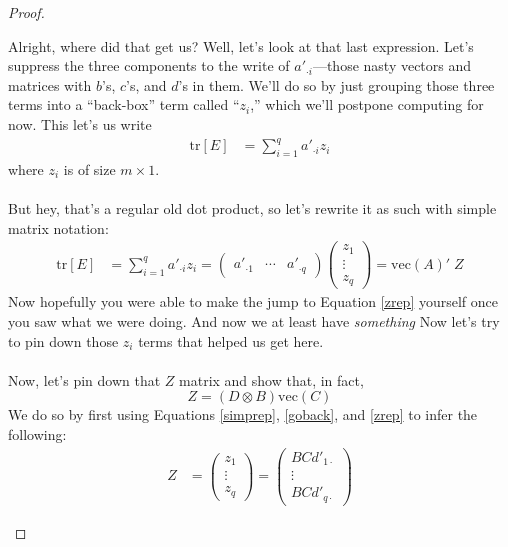 \documentclass[12pt]{article}
\theoremstyle{plain}
\theoremstyle{definition}
\theoremstyle{remark}
\begin{document}
\begin{proof}
\begin{enumerate}[label=(\roman*)]
    Alright, where did that get us? Well, let's look at
    that last expression. Let's suppress the three
    components to the write of $a'_{\cdot i}$---those nasty
    vectors and matrices with $b$'s, $c$'s, and $d$'s in
    them. We'll do so by just grouping those three
    terms into a ``back-box'' term called ``$z_i$,'' which
    we'll postpone computing for now.  This let's us
    write
    \begin{align}
        \text{tr}[E]
        &= \sum^q_{i=1} a'_{\cdot i}  z_i \label{goback}
    \end{align}
    where $z_i$ is of size $m\times 1$.
    \\
    \\
    But hey, that's a regular old dot product, so let's
    rewrite it as such with simple matrix notation:
    \begin{align}
        \text{tr}[E]
      &= \sum^q_{i=1} a'_{\cdot i}  z_i
      = \begin{pmatrix} a'_{\cdot 1}
          & \cdots & a'_{\cdot q} \end{pmatrix}
          \begin{pmatrix} z_{1}
          \\ \vdots \\ z_{q} \end{pmatrix}
      = \text{vec}(A)' \; Z
        \label{zrep}
    \end{align}
    Now hopefully you were able to make the jump to
    Equation \ref{zrep} yourself once you saw what
    we were doing.
    And now we at least have \emph{something}
    Now let's try to pin down those $z_i$ terms that
    helped us get here.
    \\
    \\
    Now, let's pin down that $Z$ matrix and show
    that, in fact,
    \begin{equation}
        Z = (D\otimes B) \text{vec}(C)
    \end{equation}
    We do so by first using Equations
    \ref{simprep}, \ref{goback}, and \ref{zrep} to infer the
    following:
    \begin{align}
        Z &= \begin{pmatrix} z_1 \\ \vdots \\ z_q
      \end{pmatrix} =
      \begin{pmatrix} BCd'_{1\cdot} \\ \vdots \\ BCd'_{q\cdot}

\end{pmatrix}
\end{align}
\end{enumerate}
\end{proof}
\end{document}
